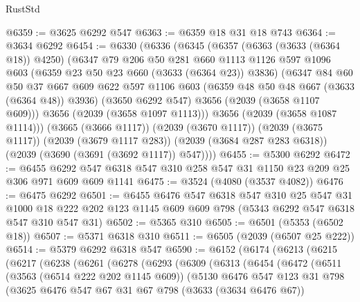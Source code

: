 \begin{lexlean}{RustStd}
\begin{coremodule}
@6359 := @3625 @6292 @547
@6363 := @6359 @18 @31 @18 @743
@6364 := @3634 @6292
@6454 := @6330
    (@6336
      (@6345
        (@6357
          (@6363 (@3633 (@6364 @18)) @4250)
          (@6347
            @79
            @206
            @50
            @281
            @660
            @1113
            @1126
            @597
            @1096
            @603
            (@6359 @23 @50 @23 @660 (@3633 (@6364 @23)) @3836)
            (@6347
              @84
              @60
              @50
              @37
              @667
              @609
              @622
              @597
              @1106
              @603
              (@6359 @48 @50 @48 @667 (@3633 (@6364 @48)) @3936)
              (@3650 @6292 @547)
              @3656
              (@2039 (@3658 @1107 @609)))
            @3656
            (@2039 (@3658 @1097 @1113)))
          @3656
          (@2039 (@3658 @1087 @1114)))
        (@3665 (@3666 @1117))
        (@2039 (@3670 @1117))
        (@2039 (@3675 @1117))
        (@2039 (@3679 @1117 @283))
        (@2039 (@3684 @287 @283 @6318))
        (@2039 (@3690 (@3691 (@3692 @1117)) @547))))
@6455 := @5300 @6292
@6472 := @6455 @6292 @547 @6318 @547 @310 @258 @547 @31 @1150 @23 @209 @25 @306 @971 @609 @609 @1141
@6475 := @3524 (@4080 (@3537 @4082))
@6476 := @6475 @6292
@6501 := @6455
    @6476
    @547
    @6318
    @547
    @310
    @25
    @547
    @31
    @1000
    @18
    @222
    @202
    @123
    @1145
    @609
    @609
    @798
    (@5343 @6292 @547 @6318 @547 @310 @547 @31)
@6502 := @5365 @310
@6505 := @6501 (@5353 (@6502 @18))
@6507 := @5371 @6318 @310
@6511 := @6505 (@2039 (@6507 @25 @222))
@6514 := @5379 @6292 @6318 @547
@6590 := @6152
    (@6174
      (@6213
        (@6215
          (@6217
            (@6238
              (@6261
                (@6278
                  (@6293
                    (@6309
                      (@6313
                        (@6454
                          (@6472
                            (@6511
                              (@3563 (@6514 @222 @202 @1145 @609))
                              (@5130
                                @6476
                                @547
                                @123
                                @31
                                @798
                                (@3625
                                  @6476
                                  @547
                                  @67
                                  @31
                                  @67
                                  @798
                                  (@3633 (@3634 @6476 @67))

\end{coremodule}
\end{lexlean}
